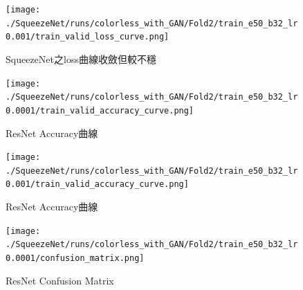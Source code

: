 \begin{figure}[!ht]
    \centering
    \texttt{[image: ./SqueezeNet/runs/colorless\_with\_GAN/Fold2/train\_e50\_b32\_lr0.001/train\_valid\_loss\_curve.png]}
    \caption{SqueezeNet之loss曲線收斂但較不穩}
    \label{fig:SqueezeNet_unconvergence_loss_curve_1e-3}
\end{figure}
\begin{figure}[!ht]
    \centering
    \texttt{[image: ./SqueezeNet/runs/colorless\_with\_GAN/Fold2/train\_e50\_b32\_lr0.0001/train\_valid\_accuracy\_curve.png]}
    \caption{ResNet Accuracy曲線}
    \label{fig:SqueezeNet_accuracy_curve_0.96}
\end{figure}
\begin{figure}[!ht]
    \centering
    \texttt{[image: ./SqueezeNet/runs/colorless\_with\_GAN/Fold2/train\_e50\_b32\_lr0.001/train\_valid\_accuracy\_curve.png]}
    \caption{ResNet Accuracy曲線}
    \label{fig:SqueezeNet_accuracy_curve_0.69}
\end{figure}
\begin{figure}[!ht]
    \centering
    \texttt{[image: ./SqueezeNet/runs/colorless\_with\_GAN/Fold2/train\_e50\_b32\_lr0.0001/confusion\_matrix.png]}
    \caption{ResNet Confusion Matrix}
    \label{fig:SqueezeNet_confuson_matrix}
\end{figure}
%
\FloatBarrier

